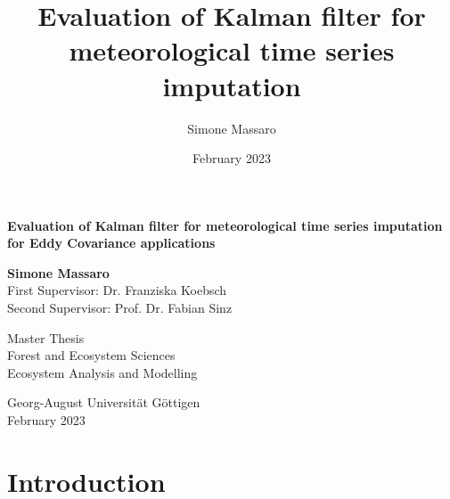 \documentclass{article}
\title{Evaluation of Kalman filter for meteorological time series imputation}
\author{Simone Massaro}
\date{February 2023}
\let\Oldsection\section
\renewcommand{\section}{\FloatBarrier\Oldsection}
\let\Oldsubsection\subsection
\renewcommand{\subsection}{\FloatBarrier\Oldsubsection}
\begin{document}
\newcommand{\vv}[1]{\texttt{#1}}

\begin{titlepage}
    \begin{center}
        \vspace*{1cm}
            
        \Huge
        \textbf{Evaluation of Kalman filter for meteorological time series imputation for Eddy Covariance applications}
            
        \vspace{0.5cm}
        \LARGE
            
        \vspace{1.5cm}
            
        \textbf{Simone Massaro} \\
        \vspace{1cm}
        First Supervisor: Dr. Franziska Koebsch\\
        Second Supervisor: Prof. Dr. Fabian Sinz 
        \vfill
            
        Master Thesis\\
        Forest and Ecosystem Sciences\\
        Ecosystem Analysis and Modelling
            
        \vspace{0.3cm}
            
        \Large
        Georg-August Universität Göttigen \\
        February 2023
            
    \end{center}
\end{titlepage}
\clearpage
\tableofcontents
\clearpage
\section{Introduction}

\end{document}
